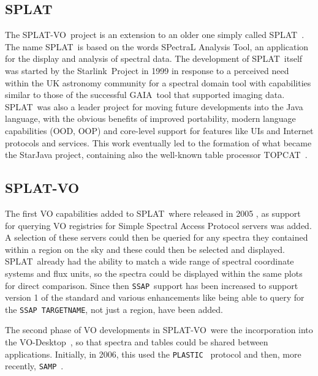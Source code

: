\documentclass[final,authoryear,5p,times,twocolumn]{elsarticle}
\newcommand{\ssap}{\texttt{SSAP}}
\newcommand{\plastic}{\texttt{PLASTIC}}
\newcommand{\samp}{\texttt{SAMP}}
\newcommand{\splat}{\textsf{\small SPLAT}}
\newcommand{\splatvo}{{\textsf{\small{SPLAT-VO}}}}
\newcommand{\topcat}{\textsf{\small TOPCAT}}
\newcommand{\gaia}{\textsf{\small GAIA}}
\newcommand{\Starlink}{\textsf{\small Starlink}}
\newcommand{\vodesktop}{\textsf{\small VO-Desktop}}
\newcommand{\ascl}[1]{\href{http://www.ascl.net/#1}{ascl:#1}}
\begin{document}
\subsection{SPLAT}
%
The \splatvo\ project is an extension to an older one simply called
\splat\ \citep[][\ascl{1402.007}]{2002ASPC..281..513B}.  The name \splat\
is based on the words SPectraL Analysis Tool, an application for the
display and analysis of spectral data. The development of \splat\ itself
was started by the \Starlink\ Project \citep{1982QJRAS..23..485D} in
1999 in response to a perceived need within the UK astronomy community
for a spectral domain tool with capabilities similar to those of the
successful \gaia\ tool \citep[][\ascl{1403.024}]{2000ASPC..216..615D}
that supported imaging data. \splat\ was also a leader project for
moving future developments into the Java language, with the obvious
benefits of improved portability, modern language capabilities (OOD,
OOP) and core-level support for features like UIs and Internet
protocols and services. This work eventually led to the formation of
what became the StarJava project, containing also the well-known table processor \topcat\ \citep[][\ascl{1101.010}]{2005ASPC..347...29T}.

\subsection{SPLAT-VO}
%
The first VO capabilities added to \splat\ where released in 2005
\citep{2005ASPC..347...22D}, as support for querying VO registries for Simple
Spectral Access Protocol servers was added. A selection of these servers could
then be queried for any spectra they contained within a region on the sky and
these could then be selected and displayed. \splat\ already had the ability to
match a wide range of spectral coordinate systems and flux units, so the
spectra could be displayed within the same plots for direct comparison. Since
then \ssap\ support has been increased to support version 1 of the standard and
various enhancements like being able to query for the \ssap\
\texttt{TARGETNAME}, not just a region, have been added.

The second phase of VO developments in \splatvo\ were the incorporation into
the \vodesktop\ \citep{2008ASPC..394..251W}, so that spectra and tables could
be shared between applications.  Initially, in 2006, this used the \plastic\
\citep{2007ASPC..376..511T} protocol and then, more recently, \samp\
\citep{2012ASPC..461..279T}.
\end{document}
